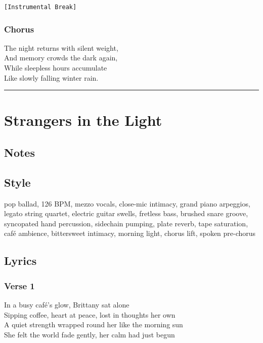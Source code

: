 \documentclass[]{article}
\begin{document}
\texttt{{[}Instrumental\ Break{]}}

\subsubsection{Chorus}\label{chorus-75}

The night returns with silent weight,\\
And memory crowds the dark again,\\
While sleepless hours accumulate\\
Like slowly falling winter rain.

\begin{center}\rule{0.5\linewidth}{0.5pt}\end{center}

\section{Strangers in the Light}\label{strangers-in-the-light}

\subsection{Notes}\label{notes-43}

\subsection{Style}\label{style-43}

pop ballad, 126 BPM, mezzo vocals, close-mic intimacy, grand piano
arpeggios, legato string quartet, electric guitar swells, fretless bass,
brushed snare groove, syncopated hand percussion, sidechain pumping,
plate reverb, tape saturation, café ambience, bittersweet intimacy,
morning light, chorus lift, spoken pre-chorus

\subsection{Lyrics}\label{lyrics-43}

\subsubsection{Verse 1}\label{verse-1-26}

In a busy café's glow, Brittany sat alone\\
Sipping coffee, heart at peace, lost in thoughts her own\\
A quiet strength wrapped round her like the morning sun\\
She felt the world fade gently, her calm had just begun
\end{document}

